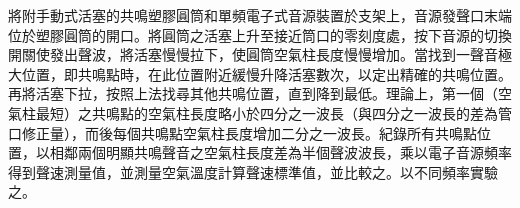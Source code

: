 \documentclass[a4paper,12pt]{report}
\begin{document}
將附手動式活塞的共鳴塑膠圓筒和單頻電子式音源裝置於支架上，音源發聲口末端位於塑膠圓筒的開口。將圓筒之活塞上升至接近筒口的零刻度處，按下音源的切換開關使發出聲波，將活塞慢慢拉下，使圓筒空氣柱長度慢慢增加。當找到一聲音極大位置，即共鳴點時，在此位置附近緩慢升降活塞數次，以定出精確的共鳴位置。再將活塞下拉，按照上法找尋其他共鳴位置，直到降到最低。理論上，第一個（空氣柱最短）之共鳴點的空氣柱長度略小於四分之一波長（與四分之一波長的差為管口修正量），而後每個共鳴點空氣柱長度增加二分之一波長。紀錄所有共鳴點位置，以相鄰兩個明顯共鳴聲音之空氣柱長度差為半個聲波波長，乘以電子音源頻率得到聲速測量值，並測量空氣溫度計算聲速標準值，並比較之。以不同頻率實驗之。
\end{document}

